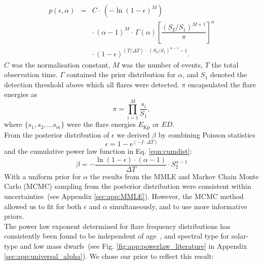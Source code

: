 \documentclass{aa}
\begin{document}
\begin{eqnarray}
\label{joint_posterior}
p(\epsilon, \alpha) &=& C \cdot\, (-\ln(1 - \epsilon)^{M})\nonumber\\
                    && \cdot\, (\alpha-1)^M \cdot\, \Gamma(\alpha) \left[\dfrac{(S_2 / S_1)^{M+1}}{\pi} \right]^{\alpha}\nonumber\\
                    && \cdot\, (1-\epsilon)^{(T / \Delta T) \,\cdot\, (S_2 /S_1)^{\alpha-1} -1 }.
\end{eqnarray}
$C$ was the normalisation constant, $M$ was the number of events, $T$ the total observation time. $\Gamma$ contained the prior distribution for $\alpha$, and $S_1$ denoted the detection threshold above which all flares were detected. $\pi$ encapsulated the flare energies as
\begin{equation}
    \pi = \displaystyle \prod_{i=1}^M \dfrac{s_i}{S_1},
\end{equation}
where $\{s_1,s_2,...s_m\}$ were the flare energies $E_\mathrm{Kp}$ or $ED$.
\\
From the posterior distribution of $\epsilon$ we derived $\beta$ by combining Poisson statistics 
\begin{equation}
\epsilon = 1 - \mathrm{e}^{(-f\cdot\Delta T)}
\label{poissonstats}
\end{equation}
and the cumulative power law function in Eq. \ref{eqn:cumdist}:
\begin{equation}
\beta = - \dfrac{\ln(1 - \epsilon)\cdot (\alpha -1)}{\Delta T} \cdot S_2^{\alpha -1}
\label{eqn:epstobeta}
\end{equation}
With a uniform prior for $\alpha$ the results from the MMLE and Markov Chain Monte Carlo (MCMC) sampling from the posterior distribution were consistent within uncertainties~(see Appendix \ref{sec:app:MMLE}). However, the MCMC method allowed us to fit for both $\epsilon$ and $\alpha$ simultaneously, and to use more informative priors. 
\\
The power law exponent determined for flare frequency distributions has consistently been found to be independent of age~\citep{davenport2019}, and spectral type for solar-type and low mass dwarfs~(see Fig. \ref{fig:app:powerlaw_literature} in Appendix \ref{sec:app:universal_alpha}). We chose our prior to reflect this result: 
\end{document}
